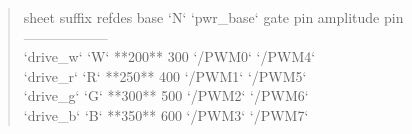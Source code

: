 \documentclass[11pt,a4paper]{article}
\begin{document}
\begin{quote}\small\ttfamily\raggedright
\textbar{} sheet \textbar{} suffix \textbar{} refdes base `N` \textbar{} `pwr\_base` \textbar{} gate pin \textbar{} amplitude pin \textbar{}\\
\textbar{}---\textbar{}---\textbar{}---\textbar{}---\textbar{}---\textbar{}---\textbar{}\\
\textbar{} `drive\_w` \textbar{} `W` \textbar{} {*}{*}200{*}{*} \textbar{} 300 \textbar{} `/PWM0` \textbar{} `/PWM4` \textbar{}\\
\textbar{} `drive\_r` \textbar{} `R` \textbar{} {*}{*}250{*}{*} \textbar{} 400 \textbar{} `/PWM1` \textbar{} `/PWM5` \textbar{}\\
\textbar{} `drive\_g` \textbar{} `G` \textbar{} {*}{*}300{*}{*} \textbar{} 500 \textbar{} `/PWM2` \textbar{} `/PWM6` \textbar{}\\
\textbar{} `drive\_b` \textbar{} `B` \textbar{} {*}{*}350{*}{*} \textbar{} 600 \textbar{} `/PWM3` \textbar{} `/PWM7` \textbar{}
\end{quote}
\end{document}
